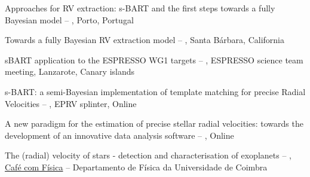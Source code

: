 
\begin{rubric}{}

	Approaches for RV extraction: s-BART and the first steps towards a fully Bayesian model -- , Porto, Portugal

	Towards a fully Bayesian RV extraction model -- , Santa Bárbara, California

	sBART application to the ESPRESSO WG1 targets -- , ESPRESSO science team meeting, Lanzarote, Canary islands

\entry*[Exoplanets IV]
	s-BART: a semi-Bayesian implementation of template matching for precise Radial Velocities -- , EPRV splinter, Online 

 A new paradigm for the estimation of precise stellar radial velocities: towards the development of an innovative data analysis software -- , Online


\entry*[2024]
	The (radial) velocity of stars - detection and characterisation of exoplanets  -- , \href{https://indico.lip.pt/category/38/}{Café com Física} --  Departamento de Física da Universidade de Coimbra 

\end{rubric}

